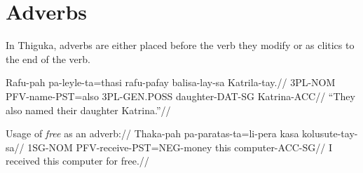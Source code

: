 \section{Adverbs}
In Thiguka, adverbs are either placed before the verb they modify or as clitics to the end of the verb.

\ex
\begingl
\gla   Rafu-pah pa-leyle-ta=thasi rafu-pafay   balisa-lay-sa   Katrila-tay.//
\glb   3PL-NOM  PFV-name-PST=also 3PL-GEN.POSS daughter-DAT-SG Katrina-ACC//
\glft  ``They also named their daughter Katrina.''//
\endgl
\xe

\ex
\begingl
\glpreamble Usage of \textit{free} as an adverb:// 
\gla   Thaka-pah pa-paratas-ta=li-pera     kasa kolusute-tay-sa//
\glb   1SG-NOM   PFV-receive-PST=NEG-money this computer-ACC-SG//
\glft  I received this computer for free.//
\endgl
\xe
